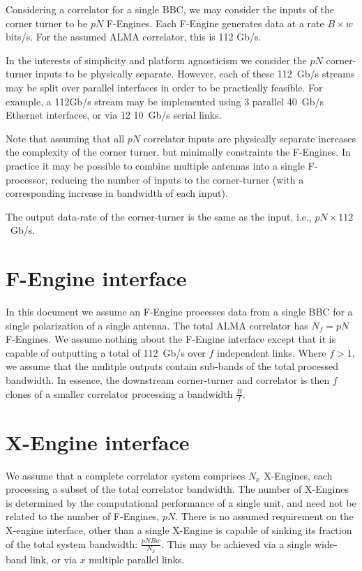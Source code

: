 \documentclass{article}
\begin{document}
Considering a correlator for a single BBC, we may consider the inputs of the corner turner to be $pN$ F-Engines. Each F-Engine generates data at a rate $B \times w$ bits/s. For the assumed ALMA correlator, this is 112 Gb/s.

In the interests of simplicity and platform agnosticism we consider the $pN$ corner-turner inputs to be physically separate. However, each of these 112~Gb/s streams may be split over parallel interfaces in order to be practically feasible. For example, a 112Gb/s stream may be implemented using 3 parallel 40~Gb/s Ethernet interfaces, or via 12 10~Gb/s serial links.

Note that assuming that all $pN$ correlator inputs are physically separate increases the complexity of the corner turner, but minimally constraints the F-Engines. In practice it may be possible to combine multiple antennas into a single F-processor, reducing the number of inputs to the corner-turner (with a corresponding increase in bandwidth of each input). 

The output data-rate of the corner-turner is the same as the input, i.e., $pN \times 112$~Gb/s. 

\section{F-Engine interface}
In this document we assume an F-Engine processes data from a single BBC for a single polarization of a single antenna. The total ALMA correlator has $N_f = pN$ F-Engines. We assume nothing about the F-Engine interface except that it is capable of outputting a total of 112~Gb/s over $f$ independent links. Where $f>1$, we assume that the mulitple outputs contain sub-bands of the total processed bandwidth. In essence, the downstream corner-turner and correlator is then $f$ clones of a smaller correlator processing a bandwidth $\frac{B}{f}$.

\section{X-Engine interface}
We assume that a complete correlator system comprises $N_x$ X-Engines, each processing a subset of the total correlator bandwidth. The number of X-Engines is determined by the computational performance of a single unit, and need not be related to the number of F-Engines, $pN$. There is no assumed requirement on the X-engine interface, other than a single X-Engine is capable of sinking its fraction of the total system bandwidth: $\frac{pNBw}{N_x}$. This may be achieved via a single wide-band link, or via $x$ multiple parallel links.
\end{document}
